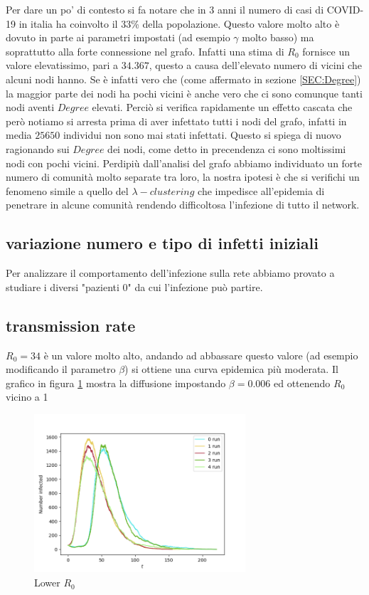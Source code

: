 \documentclass[a4paper]{article}
\begin{document}
Per dare un po' di contesto si fa notare che in 3 anni il numero di casi di COVID-19 in italia ha coinvolto il 33\% della popolazione.
Questo valore molto alto è dovuto in parte ai parametri impostati (ad esempio $\gamma$ molto basso) ma soprattutto alla forte connessione nel grafo.
Infatti una stima di $R_0$ fornisce un valore elevatissimo, pari a $34.367$, questo a causa dell'elevato numero di vicini che alcuni nodi hanno.
Se è infatti vero che (come affermato in sezione \ref{SEC:Degree}) la maggior parte dei nodi ha pochi vicini è anche vero che ci sono comunque tanti nodi aventi $Degree$ elevati.
Perciò si verifica rapidamente un effetto cascata che però notiamo si arresta prima di aver infettato tutti i nodi del grafo, infatti in media $25650$ individui non sono mai stati infettati.
Questo si spiega di nuovo ragionando sui $Degree$ dei nodi, come detto in precendenza ci sono moltissimi nodi con pochi vicini.
Perdipiù dall'analisi del grafo abbiamo individuato un forte numero di comunità molto separate tra loro, la nostra ipotesi è che si verifichi un fenomeno simile a quello del $\lambda - clustering$ che impedisce all'epidemia di penetrare in alcune comunità rendendo difficoltosa l'infezione di tutto il network.

\subsection{ variazione numero e tipo di infetti iniziali}
Per analizzare il comportamento dell'infezione sulla rete abbiamo provato a studiare i diversi "pazienti 0" da cui l'infezione può partire.

\subsection{transmission rate}
$R_0 = 34$ è un valore molto alto, andando ad abbassare questo valore (ad esempio modificando il parametro $\beta$) si ottiene una curva epidemica più moderata.
Il grafico in figura \ref{FIG:transmission_rate_06_1_random} mostra la diffusione impostando $\beta = 0.006$ ed ottenendo $R_0$ vicino a 1
\begin{figure}[!ht]
\centering
\includegraphics[width=0.7\textwidth]{transmission_rate_06_1_random.png}
\caption{Lower $R_0$} \label{FIG:transmission_rate_06_1_random}
\end{figure}
\end{document}
